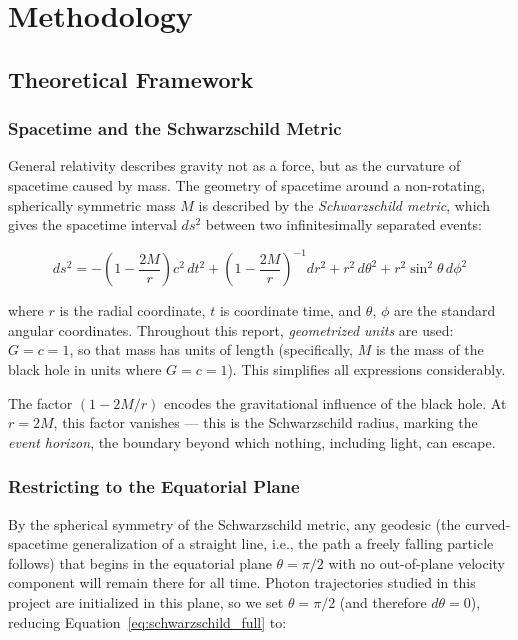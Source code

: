 \documentclass[12pt,a4paper]{article}
\begin{document}
\section{Methodology}

\subsection{Theoretical Framework}

\subsubsection{Spacetime and the Schwarzschild Metric}
General relativity describes gravity not as a force, but as the curvature of spacetime caused by mass. The geometry of spacetime around a non-rotating, spherically symmetric mass $M$ is described by the \textit{Schwarzschild metric}, which gives the spacetime interval $ds^2$ between two infinitesimally separated events:

\begin{equation}
    ds^2 = -\left(1 - \frac{2M}{r}\right)c^2\,dt^2
    + \left(1 - \frac{2M}{r}\right)^{-1}dr^2
    + r^2\,d\theta^2
    + r^2\sin^2\theta\,d\phi^2
    \label{eq:schwarzschild_full}
\end{equation}

\noindent where $r$ is the radial coordinate, $t$ is coordinate time, and $\theta$, $\phi$ are the standard angular coordinates. Throughout this report, \textit{geometrized units} are used: $G = c = 1$, so that mass has units of length (specifically, $M$ is the mass of the black hole in units where $G = c = 1$). This simplifies all expressions considerably.

The factor $\left(1 - 2M/r\right)$ encodes the gravitational influence of the black hole. At $r = 2M$, this factor vanishes — this is the Schwarzschild radius, marking the \textit{event horizon}, the boundary beyond which nothing, including light, can escape.

\subsubsection{Restricting to the Equatorial Plane}
By the spherical symmetry of the Schwarzschild metric, any geodesic (the curved-spacetime generalization of a straight line, i.e., the path a freely falling particle follows) that begins in the equatorial plane $\theta = \pi/2$ with no out-of-plane velocity component will remain there for all time. Photon trajectories studied in this project are initialized in this plane, so we set $\theta = \pi/2$ (and therefore $d\theta = 0$), reducing Equation~\eqref{eq:schwarzschild_full} to:
\end{document}
